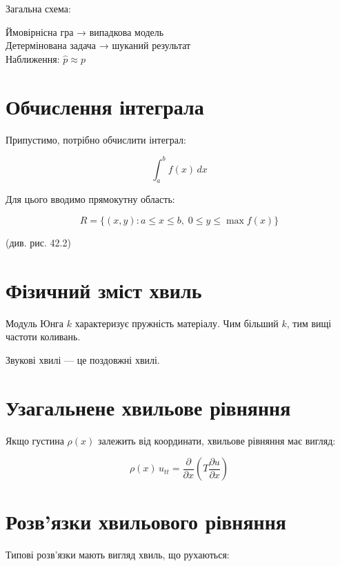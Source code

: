 \documentclass[
  ukrainian,
]{article}
\begin{document}
Загальна схема:

Ймовірнісна гра → випадкова модель\\
Детермінована задача → шуканий результат\\
Наближення: \(\hat{p} \approx p\)

\section{Обчислення
інтеграла}\label{ux43eux431ux447ux438ux441ux43bux435ux43dux43dux44f-ux456ux43dux442ux435ux433ux440ux430ux43bux430}

Припустимо, потрібно обчислити інтеграл:

\[
\int_a^b f(x)\,dx
\]

Для цього вводимо прямокутну область:

\[
R = \{(x,y): a \le x \le b,\; 0 \le y \le \max f(x)\}
\]

(див. рис. 42.2)

\section{Фізичний зміст
хвиль}\label{ux444ux456ux437ux438ux447ux43dux438ux439-ux437ux43cux456ux441ux442-ux445ux432ux438ux43bux44c}

Модуль Юнга \(k\) характеризує пружність матеріалу. Чим більший \(k\),
тим вищі частоти коливань.

Звукові хвилі --- це поздовжні хвилі.

\section{Узагальнене хвильове
рівняння}\label{ux443ux437ux430ux433ux430ux43bux44cux43dux435ux43dux435-ux445ux432ux438ux43bux44cux43eux432ux435-ux440ux456ux432ux43dux44fux43dux43dux44f}

Якщо густина \(\rho(x)\) залежить від координати, хвильове рівняння має
вигляд:

\[
\rho(x)\,u_{tt} = \frac{\partial}{\partial x}\left( T \frac{\partial u}{\partial x} \right)
\]

\section{Розв'язки хвильового
рівняння}\label{ux440ux43eux437ux432ux44fux437ux43aux438-ux445ux432ux438ux43bux44cux43eux432ux43eux433ux43e-ux440ux456ux432ux43dux44fux43dux43dux44f}

Типові розв'язки мають вигляд хвиль, що рухаються:
\end{document}
